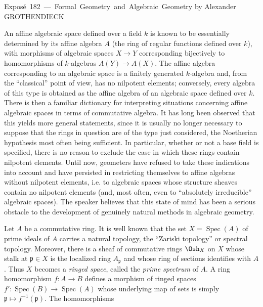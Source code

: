 \unit{Exposé 182 — Formal Geometry and Algebraic Geometry}
%
  {by Alexander GROTHENDIECK}


An affine algebraic space defined over a field $k$ is known to be essentially
determined by its affine algebra $A$ (the ring of regular functions defined over
$k$), with morphisms of algebraic spaces $X\longrightarrow Y$ corresponding
bijectively to homomorphisms of $k$-algebras
$A(Y)\longrightarrow A(X)$. The affine algebra corresponding to an algebraic
space is a finitely generated $k$-algebra and, from the “classical” point of
view, has no nilpotent elements; conversely, every algebra of this type is
obtained as the affine algebra of an algebraic space defined over $k$. There is
then a familiar dictionary for interpreting situations concerning affine
algebraic spaces in terms of commutative algebra. It has long been observed
that this yields more general statements, since it is usually no longer
necessary to suppose that the rings in question are of the type just
considered, the Noetherian hypothesis most often being sufficient. In
particular, whether or not a base field is specified, there is no reason to
exclude the case in which these rings contain nilpotent elements. Until now,
geometers have refused to take these indications into account and have
persisted in restricting themselves to affine algebras without nilpotent
elements, i.e. to algebraic spaces whose structure sheaves contain no
nilpotent elements (and, most often, even to “absolutely irreducible”
algebraic spaces). The speaker believes that this state of mind has been a
serious obstacle to the development of genuinely natural methods in algebraic
geometry.

Let $A$ be a commutative ring. It is well known that the set
$X=\operatorname{Spec}(A)$ of prime ideals of $A$ carries a natural topology,
the “Zariski topology” or spectral topology. Moreover, there is a sheaf of
commutative rings $\Osh_X$ on $X$ whose stalk at $\mathfrak p\in X$ is the
localized ring $A_{\mathfrak p}$ and whose ring of sections identifies with
$A$. Thus $X$ becomes a \emph{ringed space}, called the \emph{prime spectrum}
of $A$. A ring homomorphism $f:A\longrightarrow B$ defines a morphism of
ringed spaces
$f':\operatorname{Spec}(B)\longrightarrow\operatorname{Spec}(A)$ whose
underlying map of sets is simply
$\mathfrak p\longmapsto f^{-1}(\mathfrak p)$. The homomorphisms

